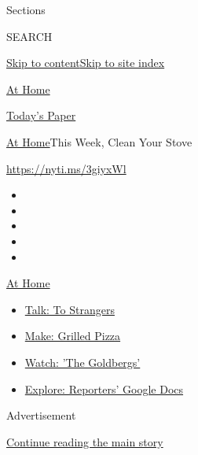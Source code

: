 Sections

SEARCH

\protect\hyperlink{site-content}{Skip to
content}\protect\hyperlink{site-index}{Skip to site index}

\href{https://www.nytimes.com/spotlight/at-home}{At Home}

\href{https://myaccount.nytimes.com/auth/login?response_type=cookie\&client_id=vi}{}

\href{https://www.nytimes.com/section/todayspaper}{Today's Paper}

\href{/spotlight/at-home}{At Home}\textbar{}This Week, Clean Your Stove

\url{https://nyti.ms/3giyxWl}

\begin{itemize}
\item
\item
\item
\item
\item
\end{itemize}

\href{https://www.nytimes.com/spotlight/at-home?action=click\&pgtype=Article\&state=default\&region=TOP_BANNER\&context=at_home_menu}{At
Home}

\begin{itemize}
\tightlist
\item
  \href{https://www.nytimes.com/2020/08/03/well/family/the-benefits-of-talking-to-strangers.html?action=click\&pgtype=Article\&state=default\&region=TOP_BANNER\&context=at_home_menu}{Talk:
  To Strangers}
\item
  \href{https://www.nytimes.com/2020/08/01/at-home/coronavirus-make-pizza-on-a-grill.html?action=click\&pgtype=Article\&state=default\&region=TOP_BANNER\&context=at_home_menu}{Make:
  Grilled Pizza}
\item
  \href{https://www.nytimes.com/2020/07/31/arts/television/goldbergs-abc-stream.html?action=click\&pgtype=Article\&state=default\&region=TOP_BANNER\&context=at_home_menu}{Watch:
  'The Goldbergs'}
\item
  \href{https://www.nytimes.com/interactive/2020/at-home/even-more-reporters-editors-diaries-lists-recommendations.html?action=click\&pgtype=Article\&state=default\&region=TOP_BANNER\&context=at_home_menu}{Explore:
  Reporters' Google Docs}
\end{itemize}

Advertisement

\protect\hyperlink{after-top}{Continue reading the main story}

